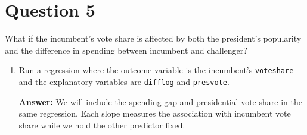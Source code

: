 \documentclass[12pt,letterpaper]{article}
\newcommand{\rcode}[2]{}
\newcommand{\answer}{\par\vspace{.18cm}\noindent\textbf{Answer:} }
\begin{document}
\newpage

\section{Question 5}
\noindent What if the incumbent's vote share is affected by both the president's popularity and the difference in spending between incumbent and challenger?

\begin{enumerate}[(1)]
\setlength{\itemsep}{4pt}\setlength{\parsep}{2pt}
\item Run a regression where the outcome variable is the incumbent's \texttt{voteshare} and the explanatory variables are \texttt{difflog} and \texttt{presvote}.

\answer We will include the spending gap and presidential vote share in the same regression. Each slope measures the association with incumbent vote share while we hold the other predictor fixed.

\rcode{203}{205}

\par\nobreak
{\footnotesize\setlength{\tabcolsep}{4pt}\renewcommand{\arraystretch}{0.93}%
\noindent{}\par}
\smallskip



\end{enumerate}
\end{document}
